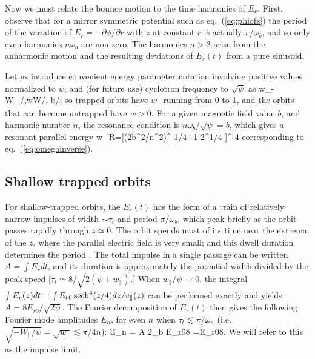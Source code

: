 \documentclass{agujournal2019}
\let\oldequation\equation
\let\oldendequation\endequation
\renewenvironment{equation}
  {\linenomathNonumbers\oldequation}
  {\oldendequation\endlinenomath}
\def\citep{\cite}
\def\wp{w_\parallel}
\def\wr{w_{\parallel R}}
\begin{document}
Now we must relate the bounce motion to the time harmonics of
$E_r$. First, observe that for a mirror symmetric potential such as
eq.\ (\ref{eq:phiofz}) the period of the variation of
$E_r=-\partial \phi/\partial r$ with $z$ at constant $r$ is actually
$\pi/\omega_b$, and so only even harmonics $n\omega_b$ are non-zero.
The harmonics $n>2$ arise from the anharmonic motion and the resulting
deviations of $E_r(t)$ from a pure sinusoid.

Let us introduce convenient energy parameter notation involving
positive values normalized to
$\psi$, and (for future use) cyclotron frequency to $\sqrt\psi$ as
\begin{equation}
  \label{eq:scaledtopsi}
  w_\parallel\equiv-W_\parallel/\psi,\qquad w\equiv W/\psi,
  \qquad b\equiv\Omega/\sqrt\psi;
\end{equation}
so trapped orbits have
$\wp$ running from 0 to 1, and the orbits that can become untrapped
have $w>0$. For a given magnetic field value
$b$, and harmonic number $n$, the resonance condition is
$n\omega_b/\sqrt{\psi}=b$,
which gives a resonant parallel energy 
\begin{equation}
  \label{eq:resen}
  \wr=[(2b^2/n^2)^{-1/4}+1-2^{1/4} ]^{-4} %
\end{equation}
corresponding to eq.\ (\ref{eq:omegainverse}).

\subsection{Shallow trapped orbits}
\label{impulsesec}

For shallow-trapped orbits, the $E_r(t)$ has the form of a train of
relatively narrow impulses of width $\sim \tau_t$ and period
$\pi/\omega_b$, which peak briefly as the orbit passes rapidly through
$z\simeq 0$. The orbit spends most of its time near the extrema of the
$z$, where the parallel electric field is very small; and this dwell duration
determines the period \citep{Hutchinson2019a}. The total impulse in a single passage can
be written $A=\int E_r dt$, and its duration is approximately the
potential width divided by the peak speed
[$\tau_t\simeq 8/\sqrt{2(\psi+\wp)}$.] When $\wp/\psi\to 0$,  the integral
$\int E_r(z)dt=\int E_{r0}\,{\rm sech}^4(z/4)dz/v_\parallel(z)$ can be
performed exactly and yields $A=8E_{r0}/\sqrt{2\psi}$. The Fourier
decomposition of $E_r(t)$ then gives the following Fourier mode
amplitudes $E_n$, for even $n$ when $\tau_t\lesssim\pi/\omega_n$ (i.e.\
$\sqrt{-W_\parallel/\psi}=\sqrt{\wp}\lesssim\pi/4n$):
\begin{equation}
  \label{eq:fouriermodes}
  E_n = A {2\omega_b\over \pi} \simeq
  E_{r0}{8\over\pi}
  =E_{r0}{8\over\pi}\sqrt{\wp}.
\end{equation}
We will refer to this as the impulse limit.
\end{document}
